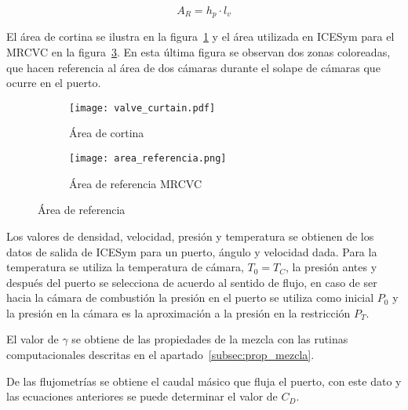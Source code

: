 \begin{equation}\label{eq:ar_mrcvc}
  A_{R} = h_{p} \cdot l_{v}
\end{equation}

El área de cortina se ilustra en la figura~\ref{fig:area_cortina} y el área
utilizada en ICESym para el MRCVC en la figura~\ref{fig:area_referencia}.
%
En esta última figura se observan dos zonas coloreadas, que hacen referencia al
área de dos cámaras durante el solape de cámaras que ocurre en el puerto.

\begin{figure}[ht]
    \centering
    \begin{subfigure}{0.5\textwidth}
      \centering
      \texttt{[image: valve\_curtain.pdf]}
      \caption{Área de cortina}\label{fig:area_cortina}
    \end{subfigure}%
    \begin{subfigure}{0.5\textwidth}
      \centering
      \texttt{[image: area\_referencia.png]}
      \caption{Área de referencia MRCVC}\label{fig:area_referencia}
    \end{subfigure}
    \caption{Área de referencia}
\end{figure}

Los valores de densidad, velocidad, presión y temperatura se obtienen de los
datos de salida de ICESym para un puerto, ángulo y velocidad dada.
%
Para la temperatura se utiliza la temperatura de cámara, $T_0 = T_C$, la presión
antes y después del puerto se selecciona de acuerdo al sentido de flujo, en caso
de ser hacia la cámara de combustión la presión en el puerto se utiliza como
inicial $P_0$ y la presión en la cámara es la aproximación a la presión en la
restricción $P_T$.

El valor de $\gamma$ se obtiene de las propiedades de la mezcla con las rutinas
computacionales descritas en el apartado~\ref{subsec:prop_mezcla}.

De las flujometrías se obtiene el caudal másico que fluja el puerto, con este
dato y las ecuaciones anteriores se puede determinar el valor de $C_{D}$.




